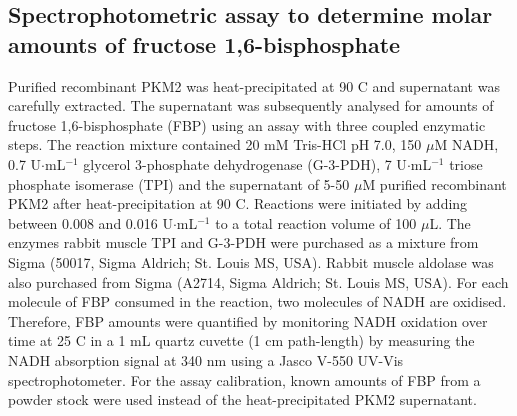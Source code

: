 \subsection{Spectrophotometric assay to determine molar amounts of fructose 1,6-bisphosphate}
Purified recombinant PKM2 was heat-precipitated at 90 \textdegree C and supernatant was carefully extracted. The supernatant was subsequently analysed for amounts of fructose 1,6-bisphosphate (FBP) using an assay with three coupled enzymatic steps. The reaction mixture contained 20 mM Tris-HCl pH 7.0, 150 $\mu$M NADH, 0.7 U$\cdot$mL$^{-1}$ glycerol 3-phosphate dehydrogenase (G-3-PDH), 7 U$\cdot$mL$^{-1}$ triose phosphate isomerase (TPI) and the supernatant of 5-50 $\mu$M purified recombinant PKM2 after heat-precipitation at 90 \textdegree C. Reactions were initiated by adding between 0.008 and 0.016 U$\cdot$mL$^{-1}$ to a total reaction volume of 100 $\mu$L. The enzymes rabbit muscle TPI and G-3-PDH were purchased as a mixture from Sigma (50017, Sigma Aldrich; St. Louis MS, USA). Rabbit muscle aldolase was also purchased from Sigma (A2714, Sigma Aldrich; St. Louis MS, USA). For each molecule of FBP consumed in the reaction, two molecules of NADH are oxidised. Therefore, FBP amounts were quantified by monitoring NADH oxidation over time at 25 \textdegree C in a 1 mL quartz cuvette (1 cm path-length) by measuring the NADH absorption signal at 340 nm using a Jasco V-550 UV-Vis spectrophotometer. For the assay calibration, known amounts of FBP from a powder stock were used instead of the heat-precipitated PKM2 supernatant.


